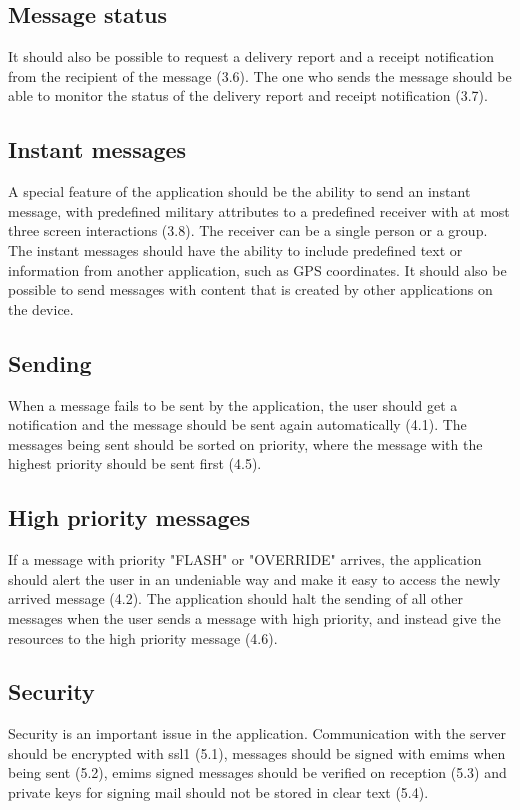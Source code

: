 \subsection{Message status}
It should also be possible to request a delivery report and a receipt notification from the recipient of the message (3.6). The one who sends the message should be able to monitor the status of the delivery report and receipt notification (3.7).

\subsection{Instant messages}
A special feature of the application should be the ability to send an instant message, with predefined military attributes to a predefined receiver with at most three screen interactions (3.8). The receiver can be a single person or a group. The instant messages should have the ability to include predefined text or information from another application, such as GPS coordinates. It should also be possible to send messages with content that is created by other applications on the device.

\subsection{Sending}
When a message fails to be sent by the application, the user should get a notification and the message should be sent again automatically (4.1). The messages being sent should be sorted on priority, where the message with the highest priority should be sent first (4.5).

\subsection{High priority messages}
If a message with priority "FLASH" or "OVERRIDE" arrives, the application should alert the user in an undeniable way and make it easy to access the newly arrived message (4.2). The application should halt the sending of all other messages when the user sends a message with high priority, and instead give the resources to the high priority message (4.6).

\subsection{Security}
Security is an important issue in the application. Communication with the server should be encrypted with \gls{ssl1} (5.1), messages should be signed with \gls{emims} when being sent (5.2), \gls{emims} signed messages should be verified on reception (5.3) and private keys for signing mail should not be stored in clear text (5.4).